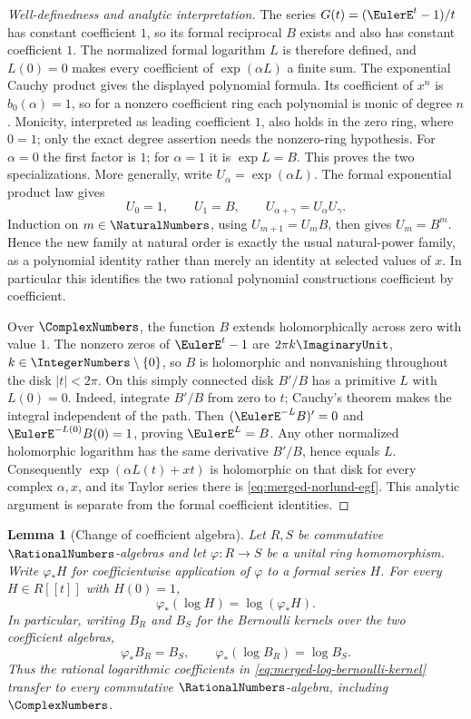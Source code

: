 \documentclass[11pt,a4paper,oneside,openany]{book}
\newtheorem{lemma}[theorem]{Lemma}
\theoremstyle{definition}
\theoremstyle{remark}
\begin{document}
\begin{proof}[Well-definedness and analytic interpretation]
The series $G(t)=(\EulerE^t-1)/t$ has constant coefficient $1$, so its
formal reciprocal $B$ exists and also has constant coefficient $1$.
The normalized formal logarithm $L$ is therefore defined, and $L(0)=0$
makes every coefficient of $\exp(\alpha L)$ a finite sum.
The exponential Cauchy product gives the displayed polynomial formula.
Its coefficient of $x^n$ is $b_0(\alpha)=1$, so for a nonzero coefficient
ring each polynomial is monic of degree $n$.  Monicity, interpreted as
leading coefficient $1$, also holds in the zero ring, where $0=1$; only
the exact degree assertion needs the nonzero-ring hypothesis.
For $\alpha=0$ the first factor is $1$; for $\alpha=1$ it is
$\exp L=B$.  This proves the two specializations.
More generally, write $U_\alpha=\exp(\alpha L)$.  The formal exponential
product law gives
\[
 U_0=1,\qquad U_1=B,\qquad U_{\alpha+\gamma}=U_\alpha U_\gamma.
\]
Induction on $m\in\NaturalNumbers$, using $U_{m+1}=U_mB$, then gives
$U_m=B^m$.  Hence the new family at natural order is exactly the usual
natural-power family, as a polynomial identity rather than merely an
identity at selected values of $x$.  In particular this identifies the
two rational polynomial constructions coefficient by coefficient.

Over $\ComplexNumbers$, the function $B$ extends holomorphically across
zero with value $1$.  The nonzero zeros of $\EulerE^t-1$ are
$2\pi k\ImaginaryUnit$, $k\in\IntegerNumbers\setminus\{0\}$, so $B$ is
holomorphic and nonvanishing throughout the disk $|t|<2\pi$.
On this simply connected disk $B'/B$ has a primitive $L$ with $L(0)=0$.
Indeed, integrate $B'/B$ from zero to $t$; Cauchy's theorem makes the
integral independent of the path.  Then
$(\EulerE^{-L}B)'=0$ and $\EulerE^{-L(0)}B(0)=1$, proving
$\EulerE^L=B$.  Any other normalized holomorphic logarithm has the same
derivative $B'/B$, hence equals $L$.
Consequently $\exp(\alpha L(t)+xt)$ is holomorphic on that disk for every
complex $\alpha,x$, and its Taylor series there is
\eqref{eq:merged-norlund-egf}.  This analytic argument is separate from
the formal coefficient identities.
\end{proof}

\begin{lemma}[Change of coefficient algebra]
\label{lem:merged-log-base-change}
Let $R,S$ be commutative $\RationalNumbers$-algebras and let
$\varphi:R\to S$ be a unital ring homomorphism.  Write $\varphi_*H$ for
coefficientwise application of $\varphi$ to a formal series $H$.
For every $H\in R[[t]]$ with $H(0)=1$,
\[
 \varphi_*(\log H)=\log(\varphi_*H).
\]
In particular, writing $B_R$ and $B_S$ for the Bernoulli kernels over the
two coefficient algebras,
\[
 \varphi_*B_R=B_S,\qquad
 \varphi_*(\log B_R)=\log B_S.
\]
Thus the rational logarithmic coefficients in
\cref{eq:merged-log-bernoulli-kernel} transfer to every commutative
$\RationalNumbers$-algebra, including $\ComplexNumbers$.
\end{lemma}
\end{document}

